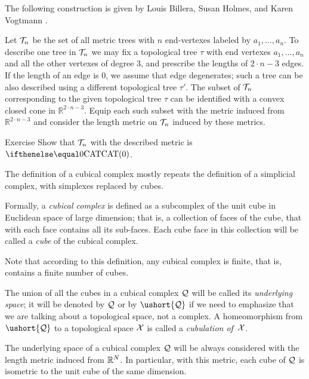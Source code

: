 The following construction is given by 
Louis Billera,
Susan Holmes,
and  Karen Vogtmann \cite{billera-holmes-vogtmann}.

Let $\mathcal{T}_n$ be the set of all metric trees with $n$ end-vertexes
labeled by $a_1,\dots,a_n$.
To describe one tree in $\mathcal{T}_n$ we may fix a topological tree $\tau$ with end vertexes $a_1,\dots,a_n$ and all the other vertexes of degree 3,  
and prescribe the lengths of $2\cdot n-3$ edges.
If the length of an edge is $0$, we assume that edge degenerates;
such a tree can be also described using a different topological tree $\tau'$.
The subset of $\mathcal{T}_n$ corresponding to the given topological tree $\tau$ can be identified with a convex closed cone in  $\mathbb{R}^{2\cdot n-3}$.
Equip each such subset with the metric induced from $\mathbb{R}^{2\cdot n-3}$ and consider the length metric on $\mathcal{T}_n$ induced by these metrics.

\begin{thm}{Exercise}\label{ex:space-of-trees}
Show that $\mathcal{T}_n$ with the described metric is $\CAT0$.
\end{thm}



The definition of a cubical complex
mostly repeats the definition of a simplicial complex, 
with simplexes replaced by cubes.

Formally, a \emph{cubical complex} is defined as a subcomplex 
of the unit cube in Euclidean space of large dimension;
that is, a collection of faces of the cube, that with each face contains all its sub-faces.
Each cube face in this collection 
will be called a {}\emph{cube} of the cubical complex.

Note that according to this definition, 
any cubical complex is finite,
that is, contains a finite number of cubes.

The union of all the cubes in a cubical complex $\mathcal{Q}$ will be called its \emph{underlying space};
it will be denoted by $\mathcal{Q}$ or by $\ushort{\spc{Q}}$ 
if we need to emphasize that we are talking about a topological space, 
not a complex.
A homeomorphism from $\ushort{\spc{Q}}$ to a topological space $\mathcal{X}$ is called a \emph{cubulation of}~$\mathcal{X}$.

The underlying space of a cubical complex $\mathcal{Q}$ will be always considered with the length metric
induced from $\mathbb{R}^N$.
In particular, with this metric, 
each cube of $\mathcal{Q}$ is isometric to the unit cube of the same dimension.

